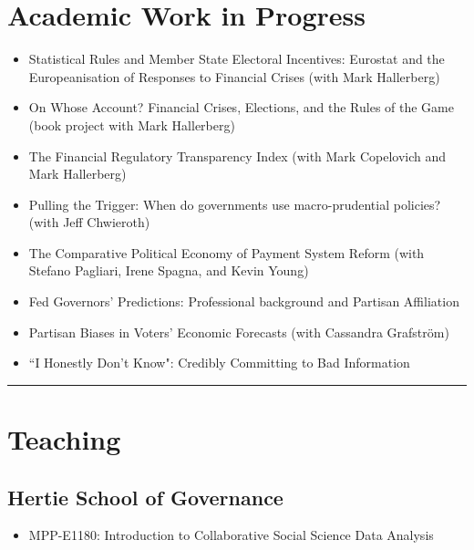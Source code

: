 \documentclass[a4paper]{article}
\begin{document}
{{\section*{Academic Work in Progress}

\begin{itemize}

    \item Statistical Rules and Member State Electoral Incentives: Eurostat and the Europeanisation of Responses to Financial Crises (with Mark Hallerberg)
    \item On Whose Account? Financial Crises, Elections, and the Rules of the Game (book project with Mark Hallerberg)
    \item The Financial Regulatory Transparency Index (with Mark Copelovich and Mark Hallerberg)
    \item Pulling the Trigger: When do governments use macro-prudential policies? (with Jeff Chwieroth)
    \item The Comparative Political Economy of Payment System Reform (with Stefano Pagliari, Irene Spagna, and Kevin Young)
    \item Fed Governors' Predictions: Professional background and Partisan Affiliation
    \item Partisan Biases in Voters' Economic Forecasts (with Cassandra Grafstr\"{o}m)
    \item ``I Honestly Don't Know": Credibly Committing to Bad Information

\end{itemize}


\vspace{0.25cm}
\medskip\hrule height 1pt
\vspace{0.5cm}

\section*{Teaching}

\subsection*{Hertie School of Governance}

\begin{itemize}

    \item MPP-E1180: Introduction to Collaborative Social Science Data Analysis


\end{itemize}}}
\end{document}
